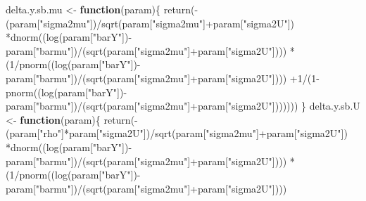 \documentclass[
]{book}
\newenvironment{Shaded}{\begin{snugshade}}{\end{snugshade}}
\newcommand{\ControlFlowTok}[1]{\textcolor[rgb]{0.13,0.29,0.53}{\textbf{#1}}}
\newcommand{\DecValTok}[1]{\textcolor[rgb]{0.00,0.00,0.81}{#1}}
\newcommand{\FunctionTok}[1]{\textcolor[rgb]{0.00,0.00,0.00}{#1}}
\newcommand{\NormalTok}[1]{#1}
\newcommand{\OtherTok}[1]{\textcolor[rgb]{0.56,0.35,0.01}{#1}}
\newcommand{\SpecialCharTok}[1]{\textcolor[rgb]{0.00,0.00,0.00}{#1}}
\newcommand{\StringTok}[1]{\textcolor[rgb]{0.31,0.60,0.02}{#1}}
\theoremstyle{definition}
\theoremstyle{definition}
\theoremstyle{definition}
\theoremstyle{definition}
\theoremstyle{remark}
\begin{document}
\begin{Shaded}
\begin{Highlighting}[]
\NormalTok{delta.y.sb.mu }\OtherTok{\textless{}{-}} \ControlFlowTok{function}\NormalTok{(param)\{}
  \FunctionTok{return}\NormalTok{(}\SpecialCharTok{{-}}\NormalTok{(param[}\StringTok{"sigma2mu"}\NormalTok{])}\SpecialCharTok{/}\FunctionTok{sqrt}\NormalTok{(param[}\StringTok{"sigma2mu"}\NormalTok{]}\SpecialCharTok{+}\NormalTok{param[}\StringTok{"sigma2U"}\NormalTok{])}
         \SpecialCharTok{*}\FunctionTok{dnorm}\NormalTok{((}\FunctionTok{log}\NormalTok{(param[}\StringTok{"barY"}\NormalTok{])}\SpecialCharTok{{-}}\NormalTok{param[}\StringTok{"barmu"}\NormalTok{])}\SpecialCharTok{/}\NormalTok{(}\FunctionTok{sqrt}\NormalTok{(param[}\StringTok{"sigma2mu"}\NormalTok{]}\SpecialCharTok{+}\NormalTok{param[}\StringTok{"sigma2U"}\NormalTok{])))}
         \SpecialCharTok{*}\NormalTok{(}\DecValTok{1}\SpecialCharTok{/}\FunctionTok{pnorm}\NormalTok{((}\FunctionTok{log}\NormalTok{(param[}\StringTok{"barY"}\NormalTok{])}\SpecialCharTok{{-}}\NormalTok{param[}\StringTok{"barmu"}\NormalTok{])}\SpecialCharTok{/}\NormalTok{(}\FunctionTok{sqrt}\NormalTok{(param[}\StringTok{"sigma2mu"}\NormalTok{]}\SpecialCharTok{+}\NormalTok{param[}\StringTok{"sigma2U"}\NormalTok{])))}
           \SpecialCharTok{+}\DecValTok{1}\SpecialCharTok{/}\NormalTok{(}\DecValTok{1}\SpecialCharTok{{-}}\FunctionTok{pnorm}\NormalTok{((}\FunctionTok{log}\NormalTok{(param[}\StringTok{"barY"}\NormalTok{])}\SpecialCharTok{{-}}\NormalTok{param[}\StringTok{"barmu"}\NormalTok{])}\SpecialCharTok{/}\NormalTok{(}\FunctionTok{sqrt}\NormalTok{(param[}\StringTok{"sigma2mu"}\NormalTok{]}\SpecialCharTok{+}\NormalTok{param[}\StringTok{"sigma2U"}\NormalTok{]))))))}
\NormalTok{\}}
\NormalTok{delta.y.sb.U }\OtherTok{\textless{}{-}} \ControlFlowTok{function}\NormalTok{(param)\{}
  \FunctionTok{return}\NormalTok{(}\SpecialCharTok{{-}}\NormalTok{(param[}\StringTok{"rho"}\NormalTok{]}\SpecialCharTok{*}\NormalTok{param[}\StringTok{"sigma2U"}\NormalTok{])}\SpecialCharTok{/}\FunctionTok{sqrt}\NormalTok{(param[}\StringTok{"sigma2mu"}\NormalTok{]}\SpecialCharTok{+}\NormalTok{param[}\StringTok{"sigma2U"}\NormalTok{])}
         \SpecialCharTok{*}\FunctionTok{dnorm}\NormalTok{((}\FunctionTok{log}\NormalTok{(param[}\StringTok{"barY"}\NormalTok{])}\SpecialCharTok{{-}}\NormalTok{param[}\StringTok{"barmu"}\NormalTok{])}\SpecialCharTok{/}\NormalTok{(}\FunctionTok{sqrt}\NormalTok{(param[}\StringTok{"sigma2mu"}\NormalTok{]}\SpecialCharTok{+}\NormalTok{param[}\StringTok{"sigma2U"}\NormalTok{])))}
         \SpecialCharTok{*}\NormalTok{(}\DecValTok{1}\SpecialCharTok{/}\FunctionTok{pnorm}\NormalTok{((}\FunctionTok{log}\NormalTok{(param[}\StringTok{"barY"}\NormalTok{])}\SpecialCharTok{{-}}\NormalTok{param[}\StringTok{"barmu"}\NormalTok{])}\SpecialCharTok{/}\NormalTok{(}\FunctionTok{sqrt}\NormalTok{(param[}\StringTok{"sigma2mu"}\NormalTok{]}\SpecialCharTok{+}\NormalTok{param[}\StringTok{"sigma2U"}\NormalTok{])))}

\end{Highlighting}
\end{Shaded}
\end{document}
